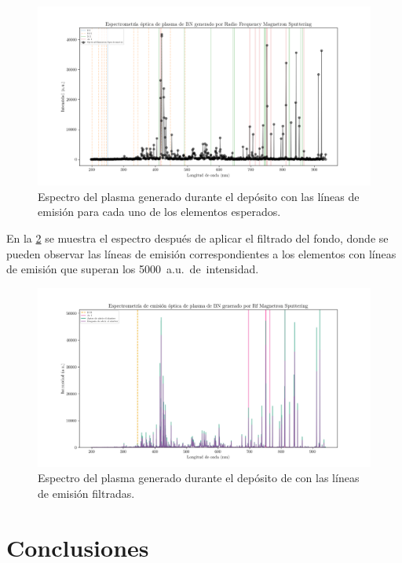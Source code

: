 \documentclass[12pt]{IEEEtran}
\begin{document}
\begin{figure}[htp]
	\centering
	\includegraphics[width=\linewidth]{longitudes_de_onda.png}
	\caption{Espectro del plasma generado durante el depósito con las líneas de emisión para cada uno de los elementos esperados.}
	\label{fig:emission-lines-complete}
\end{figure}

En la \cref{fig:espectro-final} se muestra el espectro después de aplicar el filtrado del fondo, donde se pueden observar las líneas de emisión correspondientes a los elementos con líneas de emisión que superan los \qty{5000}{a.u.} de intensidad.

\begin{figure}[htp]
	\centering
	\includegraphics[width=\linewidth]{espectroBN.jpg}
	\caption{Espectro del plasma generado durante el depósito de  con las líneas de emisión filtradas.}
	\label{fig:espectro-final}
\end{figure}



\section{Conclusiones}
\end{document}

